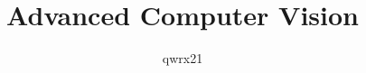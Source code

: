 \documentclass{article}
\author{qwrx21}
\title{Advanced Computer Vision}
\begin{document}
\maketitle
\pagebreak
\section{}
\subsection{}

\subsection{}

\subsection{}

\subsection{}

\pagebreak
\section{}
\subsection{}

\subsection{}

\subsection{}

\pagebreak
\section{}
\subsection{}

\subsection{}

\end{document}
